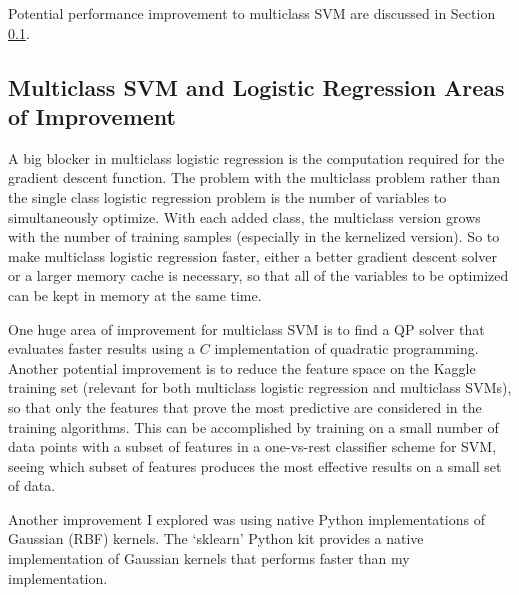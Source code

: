 \documentclass[10pt]{article}
\begin{document}
Potential performance improvement to multiclass SVM are discussed in Section \ref{sec:improvement}.

\subsection{Multiclass SVM and Logistic Regression Areas of Improvement}
\label{sec:improvement}

A big blocker in multiclass logistic regression is the computation required for the gradient descent function. The problem with the multiclass problem rather than the single class logistic regression problem is the number of variables to simultaneously optimize. With each added class, the multiclass version grows with the number of training samples (especially in the kernelized version). So to make multiclass logistic regression faster, either a better gradient descent solver or a larger memory cache is necessary, so that all of the variables to be optimized can be kept in memory at the same time.

One huge area of improvement for multiclass SVM is to find a QP solver that evaluates faster results using a $C$ implementation of quadratic programming. Another potential improvement is to reduce the feature space on the Kaggle training set (relevant for both multiclass logistic regression and multiclass SVMs), so that only the features that prove the most predictive are considered in the training algorithms. This can be accomplished by training on a small number of data points with a subset of features in a one-vs-rest classifier scheme for SVM, seeing which subset of features produces the most effective results on a small set of data.

Another improvement I explored was using native Python implementations of Gaussian (RBF) kernels. The `sklearn' Python kit provides a native implementation of Gaussian kernels that performs faster than my implementation.
\end{document}
